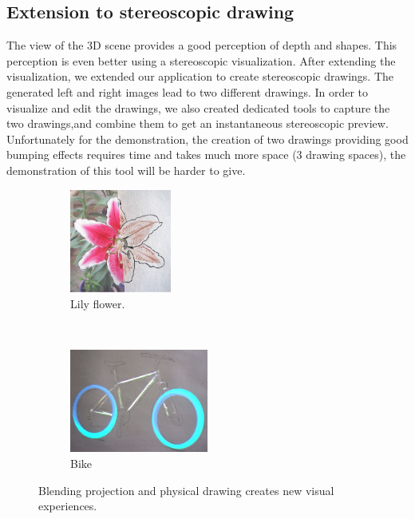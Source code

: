 \documentclass{article}
\begin{document}
\subsection{Extension to stereoscopic drawing} 
The view of the 3D scene provides a good perception of depth and shapes. This perception is even better using a stereoscopic visualization. After extending the visualization, we extended our application to create stereoscopic drawings. The generated left and right images lead to two different drawings. In order to visualize and edit the drawings, we also created dedicated tools to  capture the two drawings,and combine them to get an instantaneous stereoscopic preview. Unfortunately for the demonstration, the creation of two drawings providing good bumping effects requires time and takes much more space (3 drawing spaces), the demonstration of this tool will be harder to give.  

\begin{figure}[!h]
        \begin{subfigure}[b]{0.20\textwidth}
                \centering
                \includegraphics[height=3.4cm]{lys}
                \caption{Lily flower.}
                \label{fig:lys}
        \end{subfigure}%
        ~ %
        \begin{subfigure}[b]{0.25\textwidth}
                \centering
                \includegraphics[height=3.4cm]{velo2}
                \caption{Bike}
                \label{fig:velo}
        \end{subfigure}
        \caption{Blending projection and physical drawing creates new visual experiences.}\label{fig:drawings}
\end{figure}
\end{document}
